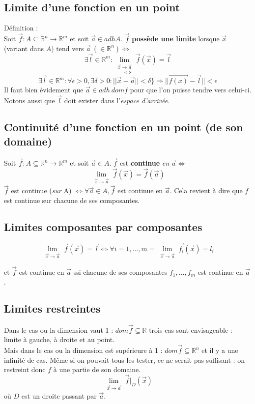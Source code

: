 \documentclass[11pt, a4paper, openany]{book}
\begin{document}
\subsection{Limite d'une fonction en un point}
Définition :\\
Soit $\vec{f} : A \subseteq \mathbb{R}^n \rightarrow \mathbb{R}^m$ et soit $\vec{a} \in adh A$. $\vec{f}$ \textbf{possède une limite} lorsque $\vec{x}$ (variant dans $A$) tend vers $\vec{a}\ (\in \mathbb{R}^n) \Leftrightarrow$
$$\exists \vec{l} \in \mathbb{R}^m : \lim\limits_{\substack{\vec{x} \to \vec{a}}} \vec{f}(\vec{x}) = \vec{l}$$
$$\Leftrightarrow$$
$$\exists \vec{l} \in \mathbb{R}^m : \forall \epsilon > 0, \exists \delta > 0 : ||\vec{x} - \vec{a}|| < \delta \}\Rightarrow ||\vec{f(x)} - \vec{l}|| < \epsilon$$
Il faut bien évidement que $\vec{a} \in adh\ domf$ pour que l'on puisse tendre vers celui-ci. Notons aussi que $\vec{l}$ doit exister dans l'\textit{espace d'arrivée}.

\subsection{Continuité d'une fonction en un point (de son domaine)}
Soit $\vec{f} : A \subseteq \mathbb{R}^n \rightarrow \mathbb{R}^m$ et soit $\vec{a} \in A.\ \vec{f}$ est \textbf{continue} \emph{en} $\vec{a} \Leftrightarrow$
$$\lim\limits_{\substack{\vec{x} \to \vec{a}}} \vec{f}(\vec{x}) = \vec{f}(\vec{a})$$
$\vec{f}$ est continue (\emph{sur} A) $\Leftrightarrow \forall\vec{a} \in A, \vec{f}$ est continue en $\vec{a}$. Cela revient à dire que $f$ est continue sur chacune de ses composantes.

\subsection{Limites composantes par composantes}
$$\lim\limits_{\substack{\vec{x} \to \vec{a}}} \vec{f}(\vec{x}) = \vec{l} \Leftrightarrow \forall i = 1, ..., m = \lim\limits_{\substack{\vec{x} \to \vec{a}}} \vec{f_i}(\vec{x}) = l_i$$
\begin{center}
	et $\vec{f}$ est continue en $\vec{a}$ ssi chacune de ses composantes $f_1, ..., f_m$ est continue en $\vec{a}$.
\end{center}
\subsection{Limites restreintes}
Dans le cas ou la dimension vaut 1 : $dom\vec{f} \subseteq \mathbb{R}$ trois cas sont envisageable : limite à gauche, à droite et au point.\\
Mais dans le cas ou la dimension est supérieure à 1 : $dom\vec{f} \subseteq \mathbb{R}^n$ et il y a une infinité de cas. Même si on pouvait tous les tester, ce ne serait pas suffisant : on restreint donc $f$ à une partie de son domaine.
$$\lim\limits_{\substack{\vec{x} \to \vec{a}}} \vec{f}|_D (\vec{x})$$
où $D$ est un droite passant par $\vec{a}$.\\
\end{document}
